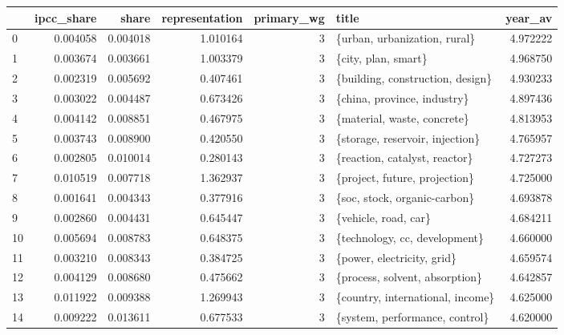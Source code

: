 \begin{tabular}{lrrrrlr}
\toprule
{} &  ipcc\_share &     share &  representation &  primary\_wg &                                   title &   year\_av \\
\midrule
0  &    0.004058 &  0.004018 &        1.010164 &           3 &            \{urban, urbanization, rural\} &  4.972222 \\
1  &    0.003674 &  0.003661 &        1.003379 &           3 &                     \{city, plan, smart\} &  4.968750 \\
2  &    0.002319 &  0.005692 &        0.407461 &           3 &        \{building, construction, design\} &  4.930233 \\
3  &    0.003022 &  0.004487 &        0.673426 &           3 &             \{china, province, industry\} &  4.897436 \\
4  &    0.004142 &  0.008851 &        0.467975 &           3 &             \{material, waste, concrete\} &  4.813953 \\
5  &    0.003743 &  0.008900 &        0.420550 &           3 &         \{storage, reservoir, injection\} &  4.765957 \\
6  &    0.002805 &  0.010014 &        0.280143 &           3 &           \{reaction, catalyst, reactor\} &  4.727273 \\
7  &    0.010519 &  0.007718 &        1.362937 &           3 &           \{project, future, projection\} &  4.725000 \\
8  &    0.001641 &  0.004343 &        0.377916 &           3 &            \{soc, stock, organic-carbon\} &  4.693878 \\
9  &    0.002860 &  0.004431 &        0.645447 &           3 &                    \{vehicle, road, car\} &  4.684211 \\
10 &    0.005694 &  0.008783 &        0.648375 &           3 &           \{technology, cc, development\} &  4.660000 \\
11 &    0.003210 &  0.008343 &        0.384725 &           3 &              \{power, electricity, grid\} &  4.659574 \\
12 &    0.004129 &  0.008680 &        0.475662 &           3 &          \{process, solvent, absorption\} &  4.642857 \\
13 &    0.011922 &  0.009388 &        1.269943 &           3 &        \{country, international, income\} &  4.625000 \\
14 &    0.009222 &  0.013611 &        0.677533 &           3 &          \{system, performance, control\} &  4.620000 \\

\end{tabular}
